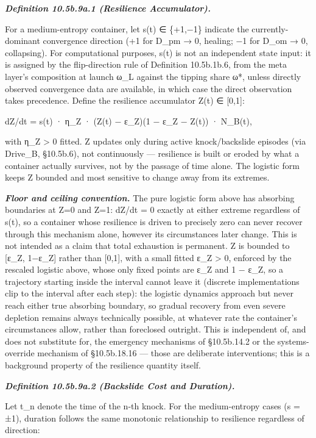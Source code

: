 \documentclass[
]{article}
\begin{document}
\emph{\textbf{Definition 10.5b.9a.1 (Resilience Accumulator).}}

For a medium-entropy container, let s(t) ∈ \{+1,−1\} indicate the
currently-dominant convergence direction (+1 for D\_pm → 0, healing; −1
for D\_om → 0, collapsing). For computational purposes, s(t) is not an
independent state input: it is assigned by the flip-direction rule of
Definition 10.5b.1b.6, from the meta layer's composition at launch ω\_L
against the tipping share ω*, unless directly observed convergence data
are available, in which case the direct observation takes precedence.
Define the resilience accumulator Z(t) ∈ {[}0,1{]}:

dZ/dt = s(t) · η\_Z · (Z(t) − ε\_Z)(1 − ε\_Z − Z(t)) · N\_B(t),

with η\_Z \textgreater{} 0 fitted. Z updates only during active
knock/backslide episodes (via Drive\_B, §10.5b.6), not continuously ---
resilience is built or eroded by what a container actually survives, not
by the passage of time alone. The logistic form keeps Z bounded and most
sensitive to change away from its extremes.

\emph{\textbf{Floor and ceiling convention.}} The pure logistic form
above has absorbing boundaries at Z=0 and Z=1: dZ/dt = 0 exactly at
either extreme regardless of s(t), so a container whose resilience is
driven to precisely zero can never recover through this mechanism alone,
however its circumstances later change. This is not intended as a claim
that total exhaustion is permanent. Z is bounded to {[}ε\_Z, 1−ε\_Z{]}
rather than {[}0,1{]}, with a small fitted ε\_Z \textgreater{} 0,
enforced by the rescaled logistic above, whose only fixed points are
ε\_Z and 1 − ε\_Z, so a trajectory starting inside the interval cannot
leave it (discrete implementations clip to the interval after each
step): the logistic dynamics approach but never reach either true
absorbing boundary, so gradual recovery from even severe depletion
remains always technically possible, at whatever rate the container's
circumstances allow, rather than foreclosed outright. This is
independent of, and does not substitute for, the emergency mechanisms of
§10.5b.14.2 or the systems-override mechanism of §10.5b.18.16 --- those
are deliberate interventions; this is a background property of the
resilience quantity itself.

\emph{\textbf{Definition 10.5b.9a.2 (Backslide Cost and Duration).}}

Let t\_n denote the time of the n-th knock. For the medium-entropy cases
(s = ±1), duration follows the same monotonic relationship to resilience
regardless of direction:
\end{document}
